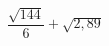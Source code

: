 \begin{ex}[type=calculate]
	\begin{condition}
		\( \dfrac{\sqrt{144}}{6}+\sqrt{2,89} \)
	\end{condition}
\end{ex}